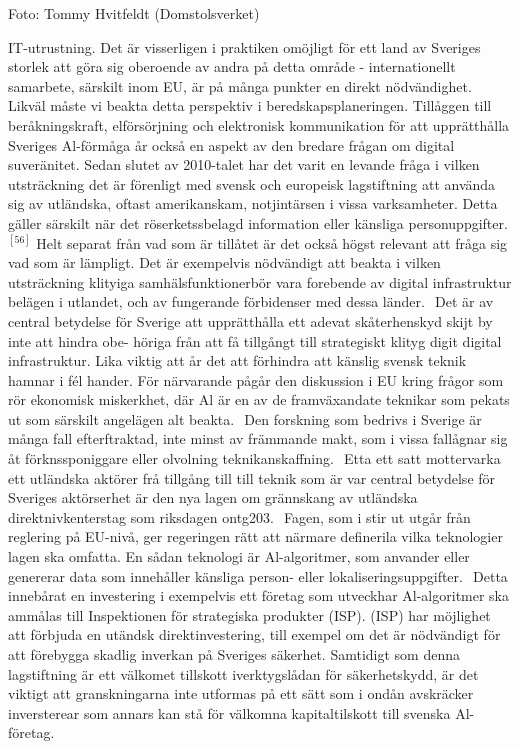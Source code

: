 {{{{{{{{Foto: Tommy Hvitfeldt (Domstolsverket)

IT-utrustning. Det är visserligen i praktiken omöjligt för ett land av Sveriges storlek att göra sig oberoende av andra på detta område - internationellt samarbete, särskilt inom EU, är på många punkter en direkt nödvändighet. Likväl måste vi beakta detta perspektiv i beredskapsplaneringen.
Tillåggen till beråkningskraft, elförsörjning och elektronisk kommunikation för att upprätthålla Sveriges Al-förmåga år också en aspekt av den bredare frågan om digital suveränitet. Sedan slutet av 2010-talet har det varit en levande fråga i vilken utsträckning det är förenligt med svensk och europeisk lagstiftning att använda sig av utländska, oftast amerikanskam, notjintärsen i vissa varksamheter. Detta gäller särskilt när det röserketssbelagd information eller känsliga personuppgifter. \({ }^{[56]}\) Helt separat från vad som är tillåtet är det också högst relevant att fråga sig vad som är lämpligt. Det är exempelvis nödvändigt att beakta i vilken utsträckning klityiga samhälsfunktionerbör vara forebende av digital infrastruktur belägen i utlandet, och av fungerande förbidenser med dessa länder. \({ }^{}\)
Det är av central betydelse för Sverige att upprätthålla ett adevat skåterhenskyd skijt by inte att hindra obe- höriga från att få tillgångt till strategiskt klityg digit digital infrastruktur. Lika viktig att år det att förhindra att känslig svensk teknik hamnar i fél hander. För närvarande pågår den diskussion i EU kring frågor som rör ekonomisk miskerkhet, där Al är en av de framväxandate teknikar som pekats ut som särskilt angelägen alt beakta. \({ }^{}\) Den forskning som bedrivs i Sverige är många fall efterftraktad, inte minst av främmande makt, som i vissa fallågnar sig åt förknssponiggare eller olvolning teknikanskaffning. \({ }^{}\)
Etta ett satt mottervarka ett utländska aktörer frå tillgång till till teknik som är var central betydelse för Sveriges aktörserhet är den nya lagen om grännskang av utländska direktnivkenterstag som riksdagen ontg203. \({ }^{}\) Fagen, som i stir ut utgår från reglering på EU-nivå, ger regeringen rätt att närmare definerila vilka teknologier lagen ska omfatta. En sådan teknologi är Al-algoritmer, som anvander eller genererar data som innehåller känsliga person- eller lokaliseringsuppgifter. \({ }^{}\) Detta innebårat en investering i exempelvis ett företag som utveckhar Al-algoritmer ska ammålas till Inspektionen för strategiska produkter (ISP). (ISP) har
möjlighet att förbjuda en utändsk direktinvestering, till exempel om det är nödvändigt för att förebygga skadlig inverkan på Sveriges säkerhet. Samtidigt som denna lagstiftning är ett välkomet tillskott iverktygslådan för säkerhetskydd, är det viktigt att granskningarna inte utformas på ett sätt som i ondån avskräcker inversterear som annars kan stå för välkomna kapitaltilskott till svenska Al-företag.
}}}}}}}}
